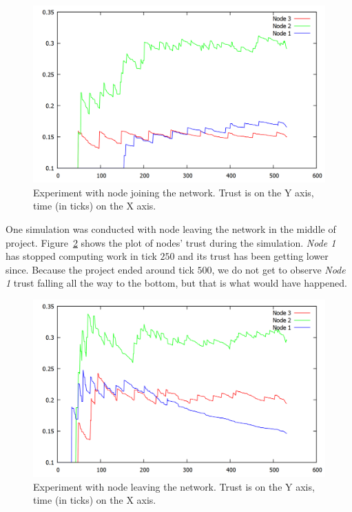 \begin{figure}
\centering
\includegraphics[width=\textwidth]{diagrams/trust_join.png}
\caption{Experiment with node joining the network. Trust is on the Y axis, time (in ticks) on the X axis.}
\label{f:trust_join}
\end{figure}

One simulation was conducted with node leaving the network in the middle of project. Figure~\ref{f:trust_leave} shows the plot of nodes' trust during the simulation. \emph{Node 1} has stopped computing work in tick $250$ and its trust has been getting lower since. Because the project ended around tick $500$, we do not get to observe \emph{Node 1} trust falling all the way to the bottom, but that is what would have happened.

\begin{figure}
\centering
\includegraphics[width=\textwidth]{diagrams/trust_leave.png}
\caption{Experiment with node leaving the network. Trust is on the Y axis, time (in ticks) on the X axis.}
\label{f:trust_leave}
\end{figure}

